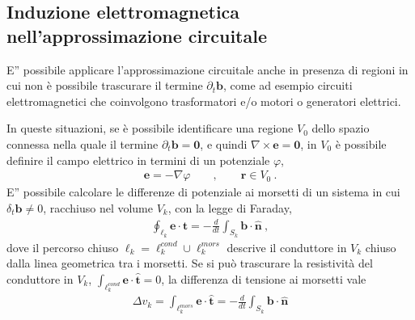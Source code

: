 \documentclass[letterpaper,10pt,italian]{jupyterBook}
\begin{document}
\subsection{Induzione elettromagnetica nell’approssimazione circuitale}
\label{\detokenize{ch/circuits-electric-induction:induzione-elettromagnetica-nell-approssimazione-circuitale}}\label{\detokenize{ch/circuits-electric-induction:classical-electromagnetism-circuits-electric-induction}}\label{\detokenize{ch/circuits-electric-induction::doc}}
\sphinxAtStartPar
E” possibile applicare l’approssimazione circuitale anche in presenza di regioni in cui non è possibile trascurare il termine \(\partial_t \mathbf{b}\), come ad esempio circuiti elettromagnetici che coinvolgono trasformatori e/o motori o generatori elettrici.

\sphinxAtStartPar
In queste situazioni, se è possibile identificare una regione \(V_0\) dello spazio connessa nella quale il termine \(\partial_t \mathbf{b} = \mathbf{0}\), e quindi \(\nabla \times \mathbf{e} = \mathbf{0}\), in \(V_0\) è possibile definire il campo elettrico in termini di un potenziale \(\varphi\),
\begin{equation*}
\begin{split}\mathbf{e} = - \nabla \varphi \qquad , \qquad \mathbf{r} \in V_0 \ .\end{split}
\end{equation*}
\sphinxAtStartPar
E” possibile calcolare le differenze di potenziale ai morsetti di un sistema in cui \(\delta_t \mathbf{b} \ne 0\), racchiuso nel volume \(V_k\), con la legge di Faraday,
\begin{equation*}
\begin{split}\oint_{\ell_k} \mathbf{e} \cdot \hat{\mathbf{t}} = - \frac{d}{dt} \int_{S_k} \mathbf{b} \cdot \hat{\mathbf{n}} \ ,\end{split}
\end{equation*}
\sphinxAtStartPar
dove il percorso chiuso \(\ell_k = \ell_k^{cond} \cup \ell_k^{mors}\) descrive il conduttore in \(V_k\) chiuso dalla linea geometrica tra i morsetti. Se si può trascurare la resistività del conduttore in \(V_k\), \(\int_{\ell_k^{cond}} \mathbf{e} \cdot \hat{\mathbf{t}} = 0\), la differenza di tensione ai morsetti vale
\begin{equation*}
\begin{split}\Delta v_k = \int_{\ell^{mors}_k} \mathbf{e} \cdot \hat{\mathbf{t}} = - \frac{d}{dt} \int_{S_k} \mathbf{b} \cdot \hat{\mathbf{n}}\end{split}
\end{equation*}
\sphinxstepscope
\end{document}
